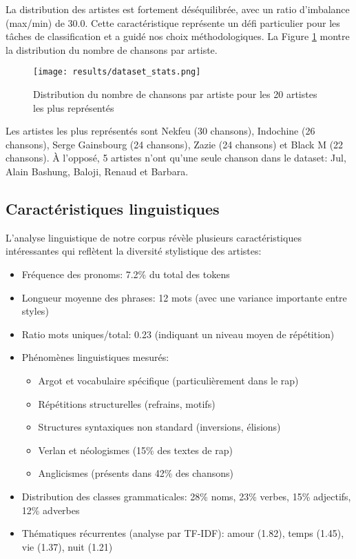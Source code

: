 \documentclass[a4paper,11pt]{article}
\begin{document}
La distribution des artistes est fortement déséquilibrée, avec un ratio d'imbalance (max/min) de 30.0. Cette caractéristique représente un défi particulier pour les tâches de classification et a guidé nos choix méthodologiques. La Figure \ref{fig:artist-distribution} montre la distribution du nombre de chansons par artiste.

\begin{figure}[ht]
    \centering
    \texttt{[image: results/dataset\_stats.png]}
    \caption{Distribution du nombre de chansons par artiste pour les 20 artistes les plus représentés}
    \label{fig:artist-distribution}
\end{figure}

Les artistes les plus représentés sont Nekfeu (30 chansons), Indochine (26 chansons), Serge Gainsbourg (24 chansons), Zazie (24 chansons) et Black M (22 chansons). À l'opposé, 5 artistes n'ont qu'une seule chanson dans le dataset: Jul, Alain Bashung, Baloji, Renaud et Barbara.

\subsection{Caractéristiques linguistiques}
L'analyse linguistique de notre corpus révèle plusieurs caractéristiques intéressantes qui reflètent la diversité stylistique des artistes:

\begin{itemize}
    \item Fréquence des pronoms: 7.2\% du total des tokens
    \item Longueur moyenne des phrases: 12 mots (avec une variance importante entre styles)
    \item Ratio mots uniques/total: 0.23 (indiquant un niveau moyen de répétition)
    \item Phénomènes linguistiques mesurés: 
    \begin{itemize}
        \item Argot et vocabulaire spécifique (particulièrement dans le rap)
        \item Répétitions structurelles (refrains, motifs)
        \item Structures syntaxiques non standard (inversions, élisions)
        \item Verlan et néologismes (15\% des textes de rap)
        \item Anglicismes (présents dans 42\% des chansons)
    \end{itemize}
    \item Distribution des classes grammaticales: 28\% noms, 23\% verbes, 15\% adjectifs, 12\% adverbes
    \item Thématiques récurrentes (analyse par TF-IDF): amour (1.82), temps (1.45), vie (1.37), nuit (1.21)
\end{itemize}
\end{document}
